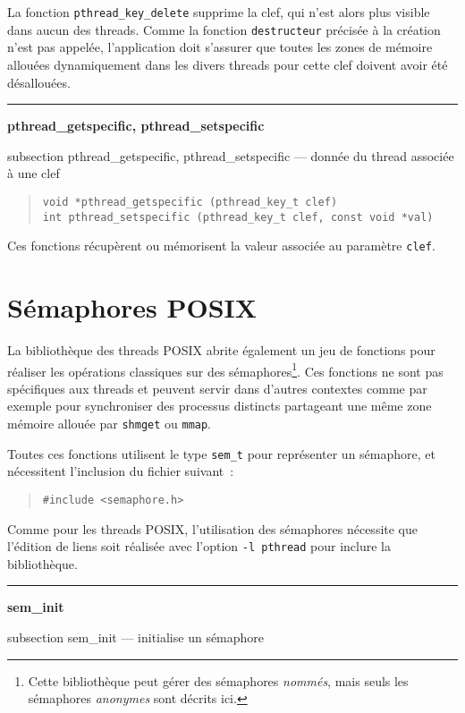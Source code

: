 \documentclass [twoside] {report}
\newcommand {\primitive} [1]
    {
	\phantomsection
	{\large \textbf {#1}}
	\addcontentsline {toc} {subsection} {#1}
    }
\newcommand {\separation}
    {
	\vspace {5mm}
	\nopagebreak
	\hrule
    }
\begin{document}
La fonction \verb|pthread_key_delete| supprime la clef, qui n'est
alors plus visible dans aucun des threads. Comme la fonction \texttt
{destructeur} précisée à la création n'est pas appelée, l'application
doit s'assurer que toutes les zones de mémoire allouées dynamiquement
dans les divers threads pour cette clef doivent avoir été désallouées.


\separation
\primitive {pthread\_getspecific, pthread\_setspecific} --- donnée du thread associée à une clef

\begin {quote}
\begin {verbatim}
void *pthread_getspecific (pthread_key_t clef)
int pthread_setspecific (pthread_key_t clef, const void *val)
\end{verbatim}
\end {quote}

Ces fonctions récupèrent ou mémorisent la valeur associée au
paramètre \texttt {clef}.


\section {Sémaphores POSIX}

La bibliothèque des threads POSIX abrite également un jeu de fonctions
pour réaliser les opérations classiques sur des sémaphores\footnote
{ Cette bibliothèque peut gérer des sémaphores \textit {nommés},
mais seuls les sémaphores \textit {anonymes} sont décrits ici.}. Ces
fonctions ne sont pas spécifiques aux threads et peuvent servir dans
d'autres contextes comme par exemple pour synchroniser des processus
distincts partageant une même zone mémoire allouée par \texttt {shmget}
ou \texttt {mmap}.

Toutes ces fonctions utilisent le type \texttt {sem\_t} pour représenter
un sémaphore, et nécessitent l'inclusion du fichier suivant~:

\begin {quote}
\begin {verbatim}
#include <semaphore.h>
\end{verbatim}
\end {quote}

Comme pour les threads POSIX, l'utilisation des sémaphores nécessite
que l'édition de liens soit réalisée avec l'option \verb|-l pthread|
pour inclure la bibliothèque.


\separation
\primitive {sem\_init} --- initialise un sémaphore
\end{document}
